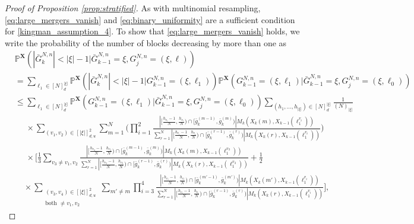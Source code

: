 \documentclass[10pt,a4paper]{amsart}
\newcommand{\bbP}{\mathbb{P}}
\newcommand{\bfX}{\mathbf{X}}
\begin{document}
\begin{proof}[Proof of Proposition \ref{prop:stratified}]
As with multinomial resampling, \eqref{eq:large_mergers_vanish} and \eqref{eq:binary_uniformity} are a sufficient condition for \eqref{kingman_assumption_4}.
To show that \eqref{eq:large_mergers_vanish} holds, we write the probability of the number of blocks decreasing by more than one as
\begin{align*}
&\bbP^{ \bfX }( | \bar{ G }_k^{ N, n } | < | \xi | - 1 | \bar{ G }_{ k - 1 }^{ N, n } = \xi, G_j^{ N, n } = ( \xi, \ell ) ) \\
&= \sum_{ \ell_1 \in [ N ]_d^{ | \xi | } } \bbP^{ \bfX }( | \bar{ G }_k^{ N, n } | < | \xi | - 1 | G_{ k - 1 }^{ N, n } = ( \xi, \ell_1 ) )  \bbP^{ \bfX }( G_{ k - 1 }^{ N, n } = ( \xi, \ell_1 ) | \bar{ G }_{ k - 1 }^{ N, n } = \xi, G_j^{ N, n } = ( \xi, \ell_0 ) ) \\
&\leq \sum_{ \ell_1 \in [ N ]_d^{ | \xi | } } \bbP^{ \bfX }( G_{ k - 1 }^{ N, n } = ( \xi, \ell_1 ) | \bar{ G }_{ k - 1 }^{ N, n } = \xi, G_j^{ N, n } = ( \xi, \ell_0 ) )  \sum_{ ( h_1, \ldots, h_{ | \xi | } ) \in [ N ]_d^{ | \xi | } }  \frac{ 1 }{ ( N )_{ | \xi | } } \\
&\phantom{\leq} \times \sum_{ ( v_1, v_2 ) \in [ | \xi | ]_{ d, u }^2 } \sum_{ m = 1 }^N \Bigg( \prod_{ i = 1 }^2 \frac{ | [ \frac{ h_{ v_i } - 1 }{ N }, \frac{ h_{ v_i } }{ N } ) \cap [ \bar{ g }_k^{ ( m - 1 ) }, \bar{ g }_k^{ ( m ) } ) | M_k( X_k( m ), X_{ k - 1 }( \ell_1^{ v_i } ) ) }{ \sum_{ r = 1 }^N | [ \frac{ h_{ v_i } - 1 }{ N }, \frac{ h_{ v_i } }{ N } ) \cap [ \bar{ g }_k^{ ( r - 1 ) }, \bar{ g }_k^{ ( r ) } ) | M_k( X_k( r ), X_{ k - 1 }( \ell_1^{ v_i } ) ) } \Bigg) \\
&\phantom{\leq} \times \Bigg[ \frac{ 1 }{ 3 } \sum_{ v_3 \neq v_1, v_2 } \frac{ | [ \frac{ h_{ v_3 } - 1 }{ N }, \frac{ h_{ v_3 } }{ N } ) \cap [ \bar{ g }_k^{ ( m - 1 ) }, \bar{ g }_k^{ ( m ) } ) | M_k( X_k( m ), X_{ k - 1 }( \ell_1^{ v_3 } ) ) }{ \sum_{ r = 1 }^N | [ \frac{ h_{ v_3 } - 1 }{ N }, \frac{ h_{ v_3 } }{ N } ) \cap [ \bar{ g }_k^{ ( r - 1 ) }, \bar{ g }_k^{ ( r ) } ) | M_k( X_k( r ), X_{ k - 1 }( \ell_1^{ v_3 } ) ) } + \frac{ 1 }{ 2 } \\
&\phantom{\times \Bigg[} \times \sum_{ \substack{ ( v_3, v_4 ) \in [ | \xi | ]_{ d, u }^2 \\ \text{both } \neq v_1, v_2 } } \sum_{ m' \neq m } \prod_{ i = 3 }^4 \frac{ | [ \frac{ h_{ v_i } - 1 }{ N }, \frac{ h_{ v_i } }{ N } ) \cap [ \bar{ g }_k^{ ( m' - 1 ) }, \bar{ g }_k^{ ( m' ) } ) | M_k( X_k( m' ), X_{ k - 1 }( \ell_1^{ v_i } ) ) }{ \sum_{ r = 1 }^N | [ \frac{ h_{ v_i } - 1 }{ N }, \frac{ h_{ v_i } }{ N } ) \cap [ \bar{ g }_k^{ ( r - 1 ) }, \bar{ g }_k^{ ( r ) } ) | M_k( X_k( r ), X_{ k - 1 }( \ell_1^{ v_i } ) ) } \Bigg],

\end{align*}
\end{proof}
\end{document}
